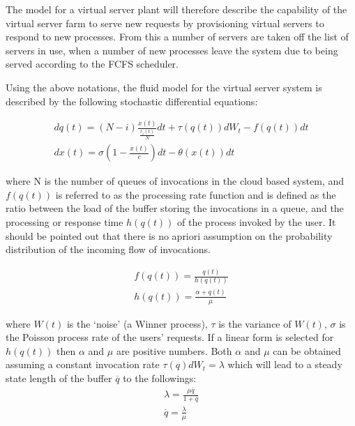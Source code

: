 The model for a virtual server plant will therefore describe the capability of the virtual server farm to serve new requests by provisioning virtual servers to respond to new processes. From this a number of servers are taken off the list of servers in use, when a number of new processes leave the system due to being served according to the FCFS scheduler.
   
Using the above notations, the fluid model for the virtual server system is described by the following stochastic differential equations:

\begin{equation}
\begin{array}{l}
dq(t)= (N-i)\frac{x(t)}{\frac{r_{i}(t)}{N}}dt +\tau(q(t))dW_{t} - f(q(t))dt \\
dx(t)= \sigma (1-\frac{x(t)}{c})dt- \theta(x(t))dt
\end{array}
\end{equation}  
    				
where N is the number of queues of invocations in the cloud based system, and $f(q(t))$ is referred to as the processing rate function and is defined as the ratio between the load of the buffer storing the invocations in a queue, and the processing or response time $h(q(t))$ of the process invoked by the user. It should be pointed out that there is no apriori assumption on the probability distribution of the incoming flow of invocations.

\begin{equation}
\begin{array}{l}
f(q(t))= \frac {q(t)}{h(q(t))}	\\
h(q(t))=  \frac {\alpha + q(t)}{\mu}
\end{array}
\end{equation}
								                            				
where  $W(t)$ is the `noise' (a Winner process), $\tau$ is the variance of $W(t)$, $\sigma$ is the Poisson process rate of the users' requests. If a linear form is selected for $h(q(t))$ then $\alpha$  and $\mu$ are positive numbers.
Both $\alpha$  and $\mu$ can be obtained assuming a constant invocation rate $\tau(q)dW_{t} = \lambda$ which will lead to a steady state length of the buffer $\overline{q}$ to the followings:
\begin{equation}
\begin{array}{l}
\lambda= \frac{\mu\overline{q}}{1+\overline{q}} \\
\overline{q} = \frac{\lambda}{\mu}
\end{array}
\label{eq:FluidFlowmodelforVServers}
\end{equation}

